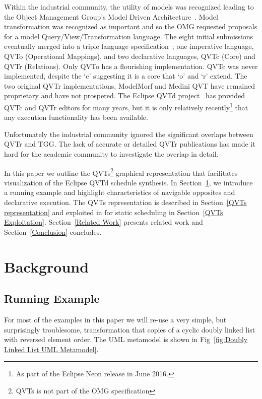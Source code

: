\documentclass{llncs}
\begin{document}
Within the industrial community, the utility of models was recognized leading to the Object Management Group's Model Driven Architecture~\cite{MDA-1.0}. Model transformation was recognized as important and so the OMG requested proposals for a model Query/View/Transformation language. The eight initial submissions eventually merged into a triple language specification~\cite{QVT-1.0}; one imperative language, QVTo (Operational Mappings), and two declarative languages, QVTc (Core) and QVTr (Relations). Only QVTo has a flourishing implementation. QVTc was never implemented, despite the `c' suggesting it is a core that `o' and `r' extend. The two original QVTr implementations, ModelMorf and Medini QVT have remained proprietary and have not prospered. The Eclipse QVTd project~\cite{Eclipse-QVTd} has provided QVTc and QVTr editors for many years, but it is only relatively recently\footnote{As part of the Eclipse Neon release in June 2016.} that any execution functionality has been available.

Unfortunately the industrial community ignored the significant overlaps between QVTr and TGG. The lack of accurate or detailed QVTr publications has made it hard for the academic community to investigate the overlap in detail.

In this paper we outline the QVTs\footnote{QVTs is not part of the OMG specification} graphical representation that facilitates visualization of the Eclipse QVTd schedule synthesis. In Section~\ref{Background}, we introduce a running example and highlight characteristics of navigable opposites and declarative execution. The QVTs representation is described in Section~\ref{QVTs representation} and exploited in for static scheduling in Section~\ref{QVTs Exploitation}. Section~\ref{Related Work} presents related work and Section~\ref{Conclusion} concludes.


\section{Background}\label{Background}

\subsection{Running Example}

For most of the examples in this paper we will re-use \cite{Willink-ICMT2017} a very simple, but surprisingly troublesome, transformation that copies of a cyclic doubly linked list with reversed element order. The UML metamodel is shown in Fig~\ref{fig:Doubly Linked List UML Metamodel}. 
\end{document}
